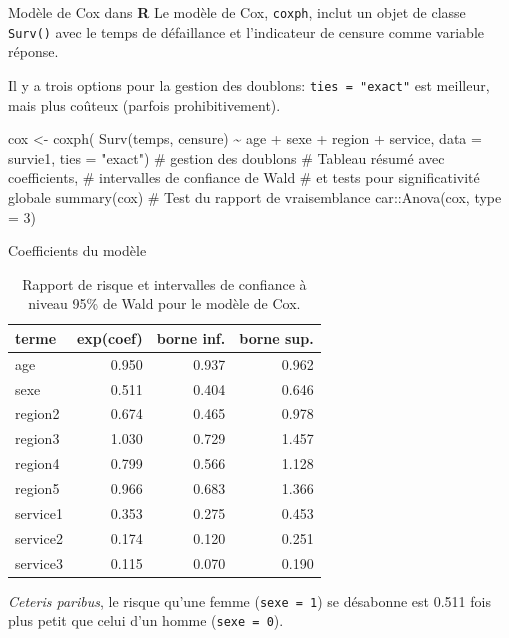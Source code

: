 \documentclass[
  ignorenonframetext,
]{beamer}
\newenvironment{Shaded}{\begin{snugshade}}{\end{snugshade}}
\newcommand{\AttributeTok}[1]{\textcolor[rgb]{0.40,0.45,0.13}{#1}}
\newcommand{\CommentTok}[1]{\textcolor[rgb]{0.37,0.37,0.37}{#1}}
\newcommand{\DecValTok}[1]{\textcolor[rgb]{0.68,0.00,0.00}{#1}}
\newcommand{\FunctionTok}[1]{\textcolor[rgb]{0.28,0.35,0.67}{#1}}
\newcommand{\NormalTok}[1]{\textcolor[rgb]{0.00,0.23,0.31}{#1}}
\newcommand{\OtherTok}[1]{\textcolor[rgb]{0.00,0.23,0.31}{#1}}
\newcommand{\SpecialCharTok}[1]{\textcolor[rgb]{0.37,0.37,0.37}{#1}}
\newcommand{\StringTok}[1]{\textcolor[rgb]{0.13,0.47,0.30}{#1}}
\begin{document}
\begin{frame}[fragile]{Modèle de Cox dans \textbf{R}}
\protect\hypertarget{moduxe8le-de-cox-dans-r}{}
Le modèle de Cox, \texttt{coxph}, inclut un objet de classe
\texttt{Surv()} avec le temps de défaillance et l'indicateur de censure
comme variable réponse.

Il y a trois options pour la gestion des doublons:
\texttt{ties\ =\ "exact"} est meilleur, mais plus coûteux (parfois
prohibitivement).

\begin{Shaded}
\begin{Highlighting}[numbers=left,,]
\NormalTok{cox }\OtherTok{\textless{}{-}} \FunctionTok{coxph}\NormalTok{(}
  \FunctionTok{Surv}\NormalTok{(temps, censure) }\SpecialCharTok{\textasciitilde{}} 
\NormalTok{    age }\SpecialCharTok{+}\NormalTok{ sexe }\SpecialCharTok{+}\NormalTok{ region }\SpecialCharTok{+}\NormalTok{ service, }
  \AttributeTok{data =}\NormalTok{ survie1,}
  \AttributeTok{ties =} \StringTok{"exact"}\NormalTok{) }\CommentTok{\# gestion des doublons}
\CommentTok{\# Tableau résumé avec coefficients,}
\CommentTok{\# intervalles de confiance de Wald}
\CommentTok{\# et tests pour significativité globale}
\FunctionTok{summary}\NormalTok{(cox)}
\CommentTok{\# Test du rapport de vraisemblance}
\NormalTok{car}\SpecialCharTok{::}\FunctionTok{Anova}\NormalTok{(cox, }\AttributeTok{type =} \DecValTok{3}\NormalTok{)}
\end{Highlighting}
\end{Shaded}
\end{frame}

\begin{frame}[fragile]{Coefficients du modèle}
\protect\hypertarget{coefficients-du-moduxe8le}{}
\hypertarget{tbl-survie5-coefs}{}
\begin{table}
\caption{\label{tbl-survie5-coefs}Rapport de risque et intervalles de confiance à niveau 95\% de Wald pour
le modèle de Cox. }\tabularnewline

\centering
\begin{tabular}{lrrr}
\toprule
terme & exp(coef) & borne inf. & borne sup.\\
\midrule
age & 0.950 & 0.937 & 0.962\\
sexe & 0.511 & 0.404 & 0.646\\
region2 & 0.674 & 0.465 & 0.978\\
region3 & 1.030 & 0.729 & 1.457\\
region4 & 0.799 & 0.566 & 1.128\\
region5 & 0.966 & 0.683 & 1.366\\
service1 & 0.353 & 0.275 & 0.453\\
service2 & 0.174 & 0.120 & 0.251\\
service3 & 0.115 & 0.070 & 0.190\\
\bottomrule
\end{tabular}
\end{table}

\emph{Ceteris paribus}, le risque qu'une femme (\texttt{sexe\ =\ 1}) se
désabonne est 0.511 fois plus petit que celui d'un homme
(\texttt{sexe\ =\ 0}).
\end{frame}
\end{document}
